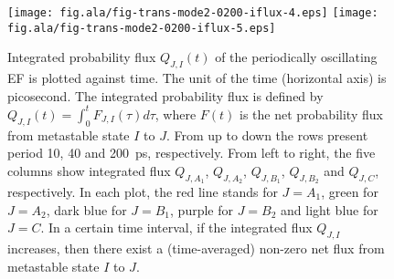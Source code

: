 \documentclass[a4paper,preprint,unsortedaddress,onecolumn]{revtex4-1}
\begin{document}
\begin{figure}
  \texttt{[image: fig.ala/fig-trans-mode2-0200-iflux-4.eps]}
  \texttt{[image: fig.ala/fig-trans-mode2-0200-iflux-5.eps]}\\
  \caption{
    Integrated probability flux $Q_{J,I}(t)$ of the periodically
    oscillating EF is plotted against time. The unit of the
    time (horizontal axis) is picosecond.
    The integrated
    probability flux is defined by $Q_{J,I}(t) = \int_0^t F_{J,I}(\tau) d\tau$, where
    $F(t)$ is the net probability flux from metastable state $I$ to $J$.
    From up to down the rows present period 10, 40 and 200~ps, respectively.
    From left to right, the five
    columns show integrated flux $Q_{J,A_1}$, $Q_{J,A_2}$,
    $Q_{J,B_1}$, $Q_{J,B_2}$ and $Q_{J,C}$, respectively. In each plot,
    the red line stands for $J=A_1$, green for $J=A_2$, dark blue for $J=B_1$,
    purple for $J=B_2$ and light blue for $J=C$. In a certain time interval,
    if the integrated flux $Q_{J,I}$ increases, then there exist a (time-averaged)
    non-zero net flux from metastable state $I$ to $J$.
  }
  \label{fig:tmp10}
\end{figure}
\end{document}

